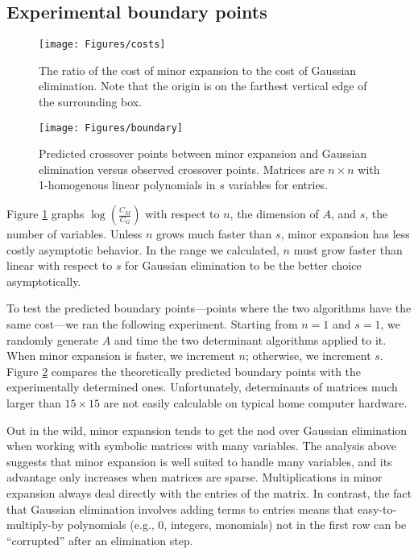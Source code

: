 \documentclass[12pt]{amsart}
\numberwithin{equation}{section}
\numberwithin{figure}{section}
\begin{document}
\subsection{Experimental boundary points}
\begin{figure}[tb]
\texttt{[image: Figures/costs]}
\vspace{-.5\baselineskip}
\caption{The ratio of the cost of minor expansion to the cost of Gaussian elimination. Note that the origin is on the farthest vertical edge of the surrounding box.}
\label{costComparison}
\end{figure}

\begin{figure}[tb]
\texttt{[image: Figures/boundary]}
\vspace{-.5\baselineskip}
\caption{Predicted crossover points between minor expansion and Gaussian elimination versus observed crossover points. Matrices are $n \times n$ with 1-homogenous linear polynomials in $s$ variables for entries.}
\label{theoryReality}
\end{figure}

Figure \ref{costComparison} graphs $\log(\frac{C_M}{C_G})$ with respect to $n$, the dimension of $A$, and $s$, the number of variables. Unless $n$ grows much faster than $s$, minor expansion has less costly asymptotic behavior. In the range we calculated, $n$ must grow faster than linear with respect to $s$ for Gaussian elimination to be the better choice asymptotically.

To test the predicted boundary points---points where the two algorithms have the same cost---we ran the following experiment. Starting from $n = 1$ and $s = 1$, we randomly generate $A$ and time the two determinant algorithms applied to it. When minor expansion is faster, we increment $n$; otherwise, we increment $s$. Figure \ref{theoryReality} compares the theoretically predicted boundary points with the experimentally determined ones. Unfortunately, determinants of matrices much larger than $15 \times 15$ are not easily calculable on typical home computer hardware.

Out in the wild, minor expansion tends to get the nod over Gaussian elimination when working with symbolic matrices with many variables. The analysis above suggests that minor expansion is well suited to handle many variables, and its advantage only increases when matrices are sparse. Multiplications in minor expansion always deal directly with the entries of the matrix. In contrast, the fact that Gaussian elimination involves adding terms to entries means that easy-to-multiply-by polynomials (e.g., 0, integers, monomials) not in the first row can be ``corrupted'' after an elimination step.
\end{document}
